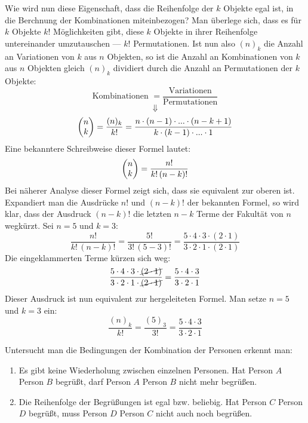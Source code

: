 Wie wird nun diese Eigenschaft, dass die Reihenfolge der $k$ Objekte egal ist, in die Berchnung der Kombinationen miteinbezogen? Man \"{u}berlege sich, dass es f\"{u}r $k$ Objekte $k!$ M\"{o}glichkeiten gibt, diese $k$ Objekte in ihrer Reihenfolge untereinander umzutauschen --- $k!$ Permutationen. Ist nun also $(n)_k$ die Anzahl an Variationen von $k$ aus $n$ Objekten, so ist die Anzahl an Kombinationen von $k$ aus $n$ Objekten gleich $(n)_k$ dividiert durch die Anzahl an Permutationen der $k$ Objekte: $$\text{Kombinationen } = \frac{\text{Variationen}}{\text{Permutationen}}$$ $$\Downarrow$$ $$ \begin{pmatrix}n \\ k\end{pmatrix} = \frac{(n)_k}{k!} = \frac{n \cdot (n - 1) \cdot ... \cdot (n - k + 1)}{k \cdot (k - 1) \cdot ... \cdot 1}$$ Eine bekanntere Schreibweise dieser Formel lautet: $$\begin{pmatrix}n \\ k\end{pmatrix} = \frac{n!}{k! \, (n - k)!}$$ Bei n\"{a}herer Analyse dieser Formel zeigt sich, dass sie equivalent zur oberen ist. Expandiert man die Ausdr\"{u}cke $n!$ und $(n - k)!$ der bekannten Formel, so wird klar, dass der Ausdruck $(n - k)!$ die letzten $n - k$ Terme der Fakult\"{a}t von $n$ wegk\"{u}rzt. Sei $n = 5$ und $k = 3$: $$\frac{n!}{k! \, (n - k)!} = \frac{5!}{3! \, (5 - 3)!} = \frac{5 \cdot 4 \cdot 3 \cdot (2 \cdot 1)}{3 \cdot 2 \cdot 1 \cdot (2 \cdot 1)}$$ Die eingeklammerten Terme k\"{u}rzen sich weg: $$\frac{5 \cdot 4 \cdot 3 \cdot \cancel{(2 \cdot 1)}}{3 \cdot 2 \cdot 1 \cdot \cancel{(2 \cdot 1)}} = \frac{5 \cdot 4 \cdot 3}{3 \cdot 2 \cdot 1}$$ Dieser Ausdruck ist nun equivalent zur hergeleiteten Formel. Man setze $n = 5$ und $k = 3$ ein: $$\frac{(n)_k}{k!} = \frac{(5)_3}{3!} = \frac{5 \cdot 4 \cdot 3}{3 \cdot 2 \cdot 1}$$


Untersucht man die Bedingungen der Kombination der Personen erkennt man: 

\begin{enumerate}
	\item Es gibt keine Wiederholung zwischen einzelnen Personen. Hat Person $A$ Person $B$ begr\"{u}\ss{}t, darf Person $A$ Person $B$ nicht mehr begr\"{u}\ss{}en. 

	\item Die Reihenfolge der Begr\"{u}\ss{}ungen ist egal bzw. beliebig. Hat Person $C$ Person $D$ begr\"{u}\ss{}t, muss Person $D$ Person $C$ nicht auch noch begr\"{u}\ss{}en. 
\end{enumerate}

